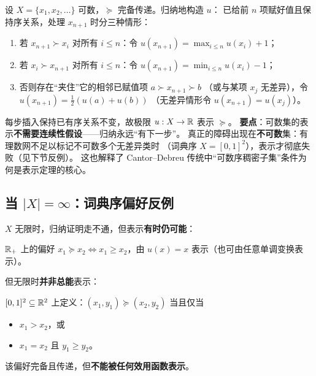 \begin{example}\label{ex:countable}
设 $X=\{x_1,x_2,\dots\}$ 可数，$\succeq$ 完备传递。归纳地构造 $u$：
已给前 $n$ 项赋好值且保持序关系，处理 $x_{n+1}$ 时分三种情形：
\begin{enumerate}
  \item 若 $x_{n+1}\succ x_i$ 对所有 $i\le n$：令 $u(x_{n+1})=\max_{i\le n}u(x_i)+1$；
  \item 若 $x_i\succ x_{n+1}$ 对所有 $i\le n$：令 $u(x_{n+1})=\min_{i\le n}u(x_i)-1$；
  \item 否则存在“夹住”它的相邻已赋值项 $a\succ x_{n+1}\succ b$
  （或与某项 $x_j$ 无差异），令 $u(x_{n+1})=\tfrac{1}{2}(u(a)+u(b))$
  （无差异情形令 $u(x_{n+1})=u(x_j)$）。
\end{enumerate}
每步插入保持已有序关系不变，故极限 $u:X\to\mathbb{R}$ 表示 $\succeq$。
\textbf{要点}：可数集的表示\textbf{不需要连续性假设}——归纳永远“有下一步”。
真正的障碍出现在\textbf{不可数}集：有理数网不足以标记不可数多个无差异类时
（词典序 $X=[0,1]^2$），表示才彻底失败（见下节反例）。
这也解释了 Cantor--Debreu 传统中“可数序稠密子集”条件为何是表示定理的核心。
\end{example}

\subsection{\texorpdfstring{当 $|X|=\infty$}{当 |X| 为无限集}：词典序偏好反例}

$X$ 无限时，归纳证明走不通，但表示\textbf{有时仍可能}：
\begin{example}[可表示的无限偏好]
$\mathbb{R}_+$ 上的偏好 $x_1\succeq x_2 \iff x_1\ge x_2$，由 $u(x)=x$ 表示（也可由任意单调变换表示）。
\end{example}

但无限时\textbf{并非总能}表示：

\begin{example}\label{ex:lexico}
$[0,1]^2\subseteq\mathbb{R}^2$ 上定义：$(x_1,y_1)\succeq(x_2,y_2)$ 当且仅当
\begin{itemize}
  \item $x_1>x_2$，或
  \item $x_1=x_2$ 且 $y_1\ge y_2$。
\end{itemize}
该偏好完备且传递，但\textbf{不能被任何效用函数表示}。
\end{example}

